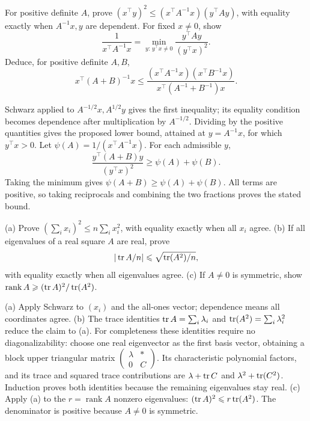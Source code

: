 \begin{problem}\label{ex:12:ineq-ma-03}
For positive definite \(A\), prove
\((x^\top y)^2\leqslant(x^\top A^{-1}x)(y^\top Ay)\), with equality
exactly when \(A^{-1}x,y\) are dependent.
For fixed \(x\ne0\), show
\[
\frac1{x^\top A^{-1}x}
=\min_{y:\,y^\top x\ne0}\frac{y^\top Ay}{(y^\top x)^2}.
\]
Deduce, for positive definite \(A,B\),
\[
x^\top(A+B)^{-1}x\leqslant
\frac{(x^\top A^{-1}x)(x^\top B^{-1}x)}{x^\top(A^{-1}+B^{-1})x}.
\]
\end{problem}
\begin{solution}
Schwarz applied to \(A^{-1/2}x,A^{1/2}y\) gives the first inequality;
its equality condition becomes dependence after multiplication by
\(A^{-1/2}\). Dividing by the positive quantities gives the proposed
lower bound, attained at \(y=A^{-1}x\), for which \(y^\top x>0\).
Let \(\psi(A)=1/(x^\top A^{-1}x)\). For each admissible \(y\),
\[
\frac{y^\top(A+B)y}{(y^\top x)^2}
\geqslant\psi(A)+\psi(B).
\]
Taking the minimum gives \(\psi(A+B)\geqslant\psi(A)+\psi(B)\).
All terms are positive, so taking reciprocals and combining the two
fractions proves the stated bound.
\end{solution}

\begin{problem}\label{ex:12:ineq-ma-04}
(a) Prove \((\sum_i x_i)^2\leqslant n\sum_i x_i^2\), with equality
exactly when all \(x_i\) agree.
(b) If all eigenvalues of a real square \(A\) are real, prove
\[|\operatorname{tr} A/n|\leqslant\sqrt{\operatorname{tr}(A^2)/n},\]
with equality exactly when all eigenvalues agree.
(c) If \(A\ne0\) is symmetric, show
\(\operatorname{rank}A\geqslant(\operatorname{tr} A)^2/\operatorname{tr}(A^2)\).
\end{problem}
\begin{solution}
(a) Apply Schwarz to \((x_i)\) and the all-ones vector; dependence means
all coordinates agree.
(b) The trace identities \(\operatorname{tr} A=\sum_i\lambda_i\) and
\(\operatorname{tr}(A^2)=\sum_i\lambda_i^2\) reduce the claim to (a).
For completeness these identities require no diagonalizability: choose
one real eigenvector as the first basis vector, obtaining a block upper
triangular matrix \(\begin{pmatrix}\lambda&*\\0&C\end{pmatrix}\).
Its characteristic polynomial factors, and its trace and squared trace
contributions are \(\lambda+\operatorname{tr} C\) and \(\lambda^2+\operatorname{tr}(C^2)\).
Induction proves both identities because the remaining eigenvalues stay real.
(c) Apply (a) to the \(r=\operatorname{rank}A\) nonzero eigenvalues:
\((\operatorname{tr} A)^2\leqslant r\operatorname{tr}(A^2)\). The denominator is positive because
\(A\ne0\) is symmetric.
\end{solution}


